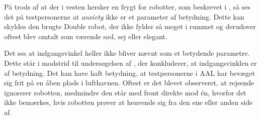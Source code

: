 På trods af at der i vesten hersker en frygt for robotter, som beskrevet i , så ses det på testpersonerne at \textit{anxiety} ikke er et parameter af betydning. Dette kan skyldes den brugte Double robot, der ikke fylder så meget i rummet og derudover oftest blev omtalt som værende sød, sej eller elegant. 

Det ses at indgangsvinkel heller ikke bliver nævnt som et betydende parametre. Dette står i modstrid til undersøgelsen af \textcite{PDF:HowMayIServeYou}, der konkluderer, at indgangsvinklen er af betydning. Det kan have haft betydning, at testpersonerne i AAL har bevæget sig frit på en åben plads i lufthavnen. Oftest er det blevet observeret, at rejsende ignorerer robotten, medmindre den står med front direkte mod én, hvorfor det ikke bemærkes, hvis robotten prøver at henvende sig fra den ene eller anden side af. 

%






